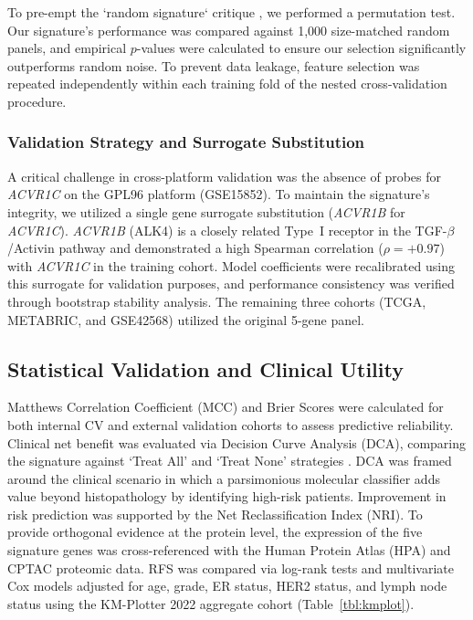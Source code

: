 \documentclass[a4paper,fleqn]{cas-dc}
\newcommand{\gene}[1]{\textit{#1}}
\begin{document}
To pre-empt the `random signature` critique \citep{venet2011}, we performed a permutation test. Our signature's performance was compared against 1,000 size-matched random panels, and empirical $p$-values were calculated to ensure our selection significantly outperforms random noise. To prevent data leakage, feature selection was repeated independently within each training fold of the nested cross-validation procedure.

\subsubsection{Validation Strategy and Surrogate Substitution}\label{sec:substitution}
A critical challenge in cross-platform validation was the absence of probes for \gene{ACVR1C} on the GPL96 platform (GSE15852). To maintain the signature's integrity, we utilized a single gene surrogate substitution (\gene{ACVR1B} for \gene{ACVR1C}). \gene{ACVR1B} (ALK4) is a closely related Type~I receptor in the TGF-$\beta$/Activin pathway and demonstrated a high Spearman correlation ($\rho=+0.97$) with \gene{ACVR1C} in the training cohort. Model coefficients were recalibrated using this surrogate for validation purposes, and performance consistency was verified through bootstrap stability analysis. The remaining three cohorts (TCGA, METABRIC, and GSE42568) utilized the original 5-gene panel.

\subsection{Statistical Validation and Clinical Utility}\label{sec:stats}
Matthews Correlation Coefficient (MCC) and Brier Scores were calculated for both internal CV and external validation cohorts to assess predictive reliability. Clinical net benefit was evaluated via Decision Curve Analysis (DCA), comparing the signature against `Treat All' and `Treat None' strategies \citep{vickers2006}. DCA was framed around the clinical scenario in which a parsimonious molecular classifier adds value beyond histopathology by identifying high-risk patients. Improvement in risk prediction was supported by the Net Reclassification Index (NRI). To provide orthogonal evidence at the protein level, the expression of the five signature genes was cross-referenced with the Human Protein Atlas (HPA) and CPTAC proteomic data. RFS was compared via log-rank tests and multivariate Cox models adjusted for age, grade, ER status, HER2 status, and lymph node status using the KM-Plotter 2022 aggregate cohort (Table~\ref{tbl:kmplot}).
\end{document}
